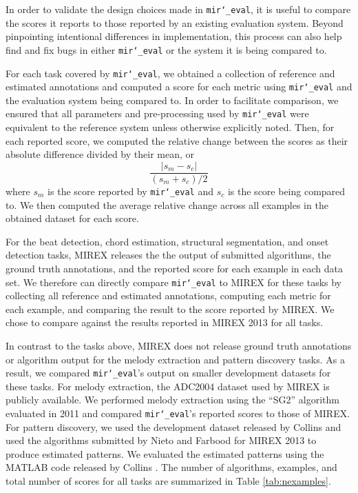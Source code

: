 \documentclass{article}
\def\mireval{\texttt{mir\char`_eval}}
\begin{document}
In order to validate the design choices made in \mireval{}, it is useful to compare the scores it reports to those reported by an existing evaluation system.
Beyond pinpointing intentional differences in implementation, this process can also help find and fix bugs in either \mireval{} or the system it is being compared to.

For each task covered by \mireval{}, we obtained a collection of reference and estimated annotations and computed a score for each metric using \mireval{} and the evaluation system being compared to.
In order to facilitate comparison, we ensured that all parameters and pre-processing used by \mireval{} were equivalent to the reference system unless otherwise explicitly noted.
Then, for each reported score, we computed the relative change between the scores as their absolute difference divided by their mean, or
$$
\frac{|s_m - s_c|}{(s_m + s_c)/2}
$$
where $s_m$ is the score reported by \mireval{} and $s_c$ is the score being compared to.
We then computed the average relative change across all examples in the obtained dataset for each score.

For the beat detection, chord estimation, structural segmentation, and onset detection tasks, MIREX releases the the output of submitted algorithms, the ground truth annotations, and the reported score for each example in each data set.
We therefore can directly compare \mireval{} to MIREX for these tasks by collecting all reference and estimated annotations, computing each metric for each example, and comparing the result to the score reported by MIREX.
We chose to compare against the results reported in MIREX 2013 for all tasks.

In contrast to the tasks above, MIREX does not release ground truth annotations or algorithm output for the melody extraction and pattern discovery tasks.
As a result, we compared \mireval{}'s output on smaller development datasets for these tasks.
For melody extraction, the ADC2004 dataset used by MIREX is publicly available.
We performed melody extraction using the ``SG2'' algorithm evaluated in 2011 \cite{salamon:MelodyExraction:TASLP:12} and compared \mireval{}'s reported scores to those of MIREX.
For pattern discovery, we used the development dataset released by Collins \cite{Collins2013} and used the algorithms submitted by Nieto and Farbood \cite{nieto2013discovery} for MIREX 2013 to produce estimated patterns.
We evaluated the estimated patterns using the MATLAB code released by Collins \cite{Collins2013}.
The number of algorithms, examples, and total number of scores for all tasks are summarized in Table \ref{tab:nexamples}.
\end{document}
